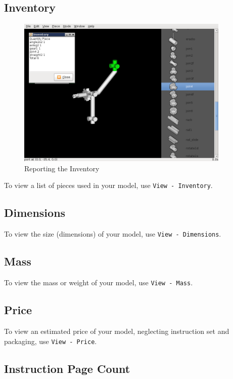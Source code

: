 \documentclass[12pt]{report}
\begin{document}
\subsection{Inventory}

\begin{figure}[h]
\begin{center}
\includegraphics[width=4.0in]{doc_images/manual_inventory.png}
\caption{Reporting the Inventory}
\label{Inventory}
\end{center}
\end{figure}

To view a list of pieces used in your model, use {\tt View -
  Inventory}.

\subsection{Dimensions}

To view the size (dimensions) of your model, use {\tt View -
  Dimensions}.

\subsection{Mass}

To view the mass or weight of your model, use {\tt View - Mass}.

\subsection{Price}

To view an estimated price of your model, neglecting instruction set
and packaging, use {\tt View - Price}.

\subsection{Instruction Page Count}
\end{document}
